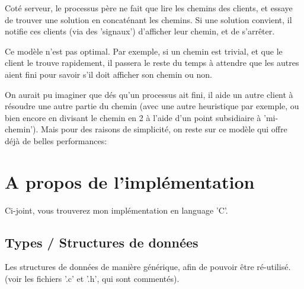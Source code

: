 \documentclass[10pt]{article}
\begin{document}
			Coté serveur, le processus père ne fait que lire les chemins des clients, et essaye de trouver une
			solution en concaténant les chemins. Si une solution convient, il notifie ces clients (via des 'signaux')
			d'afficher leur chemin, et de s'arrêter.\newline
			
			Ce modèle n'est pas optimal. Par exemple, si un chemin est trivial, et que le client
			le trouve rapidement, il passera le reste du temps à attendre que les autres aient fini
			pour savoir s'il doit afficher son chemin ou non.\newline
			
			On aurait pu imaginer que dés qu'un processus ait fini, il aide un autre client à résoudre une autre partie du chemin
			(avec une autre heuristique par exemple, ou bien encore en divisant le chemin en 2 à l'aide d'un point subsidiaire à 'mi-chemin').
			Mais pour des raisons de simplicité, on reste sur ce modèle qui offre déjà de belles performances:

	\newpage
	\section{A propos de l'implémentation}
		Ci-joint, vous trouverez mon implémentation en language 'C'.
		\subsection{Types / Structures de données}
		
		Les structures de données de manière générique, afin de pouvoir être ré-utilisé.
		(voir les fichiers '.c' et '.h', qui sont commentés). 
\end{document}
